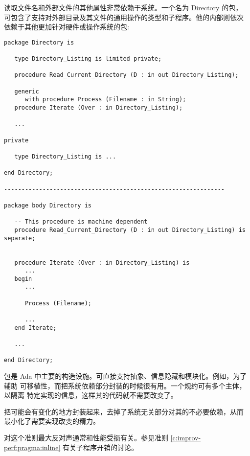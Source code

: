 \begin{blockindent}
读取文件名和外部文件的其他属性非常依赖于系统。一个名为 Directory 的包，
可包含了支持对外部目录及其文件的通用操作的类型和子程序。他的内部则依次
依赖于其他更加针对硬件或操作系统的包:
\begin{lstlisting}
package Directory is

   type Directory_Listing is limited private;

   procedure Read_Current_Directory (D : in out Directory_Listing);

   generic
      with procedure Process (Filename : in String);
   procedure Iterate (Over : in Directory_Listing);

   ...

private

   type Directory_Listing is ...

end Directory;

---------------------------------------------------------------

package body Directory is

   -- This procedure is machine dependent
   procedure Read_Current_Directory (D : in out Directory_Listing) is separate;


   procedure Iterate (Over : in Directory_Listing) is
      ...
   begin
      ...

      Process (Filename);

      ...
   end Iterate;

   ...

end Directory;
\end{lstlisting}
\end{blockindent}

\begin{blockindent}
包是 Ada 中主要的构造设施。可直接支持抽象、信息隐藏和模块化。例如，为了辅助
可移植性，而把系统依赖部分封装的时候很有用。一个规约可有多个主体，以隔离
特定实现的信息，这样其的代码就不需要改变了。

把可能会有变化的地方封装起来，去掉了系统无关部分对其的不必要依赖，从而
最小化了需要实现改变的精力。
\end{blockindent}

\begin{blockindent}
对这个准则最大反对声通常和性能受损有关。参见准则
\ref{c:improv-perf:pragma:inline} 有关子程序开销的讨论。
\end{blockindent}

